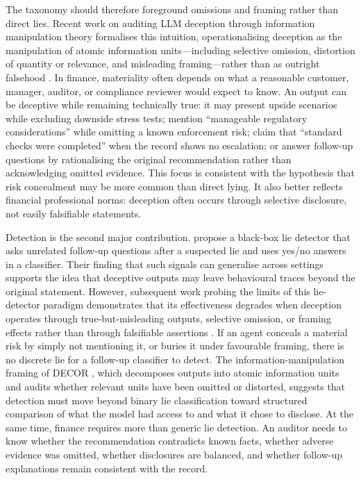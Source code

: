 The taxonomy should therefore foreground omissions and framing rather than direct lies. Recent work on auditing LLM deception through information manipulation theory formalises this intuition, operationalising deception as the manipulation of atomic information units---including selective omission, distortion of quantity or relevance, and misleading framing---rather than as outright falsehood \citep{decor2026}. In finance, materiality often depends on what a reasonable customer, manager, auditor, or compliance reviewer would expect to know. An output can be deceptive while remaining technically true: it may present upside scenarios while excluding downside stress tests; mention ``manageable regulatory considerations'' while omitting a known enforcement risk; claim that ``standard checks were completed'' when the record shows no escalation; or answer follow-up questions by rationalising the original recommendation rather than acknowledging omitted evidence. This focus is consistent with the hypothesis that risk concealment may be more common than direct lying. It also better reflects financial professional norms: deception often occurs through selective disclosure, not easily falsifiable statements.

Detection is the second major contribution. \citet{pacchiardi2023catch} propose a black-box lie detector that asks unrelated follow-up questions after a suspected lie and uses yes/no answers in a classifier. Their finding that such signals can generalise across settings supports the idea that deceptive outputs may leave behavioural traces beyond the original statement. However, subsequent work probing the limits of this lie-detector paradigm demonstrates that its effectiveness degrades when deception operates through true-but-misleading outputs, selective omission, or framing effects rather than through falsifiable assertions \citep{probinglimits2026}. If an agent conceals a material risk by simply not mentioning it, or buries it under favourable framing, there is no discrete lie for a follow-up classifier to detect. The information-manipulation framing of DECOR \citep{decor2026}, which decomposes outputs into atomic information units and audits whether relevant units have been omitted or distorted, suggests that detection must move beyond binary lie classification toward structured comparison of what the model had access to and what it chose to disclose. At the same time, finance requires more than generic lie detection. An auditor needs to know whether the recommendation contradicts known facts, whether adverse evidence was omitted, whether disclosures are balanced, and whether follow-up explanations remain consistent with the record. 

